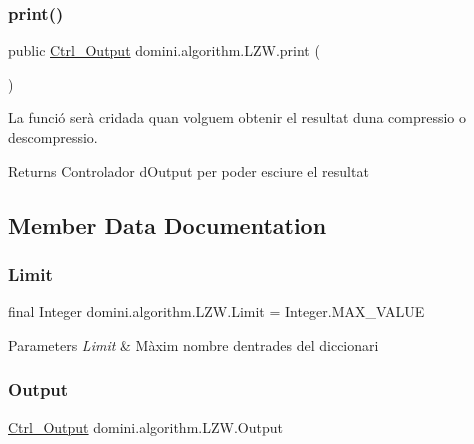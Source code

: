 \subsubsection{\texorpdfstring{print()}{print()}}
{\footnotesize\ttfamily public \hyperlink{classpersistencia_1_1output_1_1Ctrl__Output}{Ctrl\+\_\+\+Output} domini.\+algorithm.\+L\+Z\+W.\+print (\begin{DoxyParamCaption}{ }\end{DoxyParamCaption})\hspace{0.3cm}{\ttfamily [inline]}}



La funció serà cridada quan volguem obtenir el resultat d\textquotesingle{}una compressio o descompressio. 

\begin{DoxyReturn}{Returns}
Controlador d\textquotesingle{}Output per poder esciure el resultat 
\end{DoxyReturn}


\subsection{Member Data Documentation}
\mbox{\label{classdomini_1_1algorithm_1_1LZW_a6d83dbcda4939db767fa0522d40fcc0a}} 
\subsubsection{\texorpdfstring{Limit}{Limit}}
{\footnotesize\ttfamily final Integer domini.\+algorithm.\+L\+Z\+W.\+Limit = Integer.\+M\+A\+X\+\_\+\+V\+A\+L\+UE\hspace{0.3cm}{\ttfamily [package]}}


\begin{DoxyParams}{Parameters}
{\em Limit} & Màxim nombre d\textquotesingle{}entrades del diccionari \\
\hline
\end{DoxyParams}
\mbox{\label{classdomini_1_1algorithm_1_1LZW_a22cd522a89b5226a3fb3424ffe122f72}} 
\subsubsection{\texorpdfstring{Output}{Output}}
{\footnotesize\ttfamily \hyperlink{classpersistencia_1_1output_1_1Ctrl__Output}{Ctrl\+\_\+\+Output} domini.\+algorithm.\+L\+Z\+W.\+Output\hspace{0.3cm}{\ttfamily [package]}}


